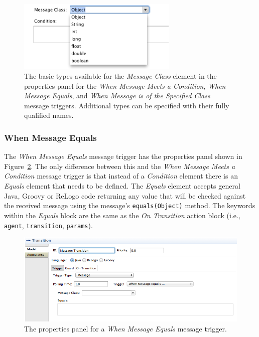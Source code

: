 \documentclass[11pt]{amsart}
\begin{document}
\begin{figure}
\begin{center}
\vspace{.2in}
\centerline {
\includegraphics[width=3.0in]{StatechartsImages/MessageClassType.png}
}
\caption{The basic types available for the \emph{Message Class} element in the properties panel for the \emph{When Message Meets a Condition}, \emph{When Message Equals}, and \emph{When Message is of the Specified Class} message triggers. Additional types can be specified with their fully qualified names.}
\label{fig:messageClassType}
\end{center}
\end{figure}
\clearpage


\subsubsection{When Message Equals}
The \emph{When Message Equals} message trigger has the properties panel shown in Figure~\ref{fig:message2TransitionProperties}. The only difference between this and the \emph{When Message Meets a Condition} message trigger is that instead of a \emph{Condition} element there is an \emph{Equals} element that needs to be defined. The \emph{Equals} element accepts general Java, Groovy or ReLogo code returning any value that will be checked against the received message using the message's \texttt{equals(Object)} method. The keywords within the \emph{Equals} block are the same as the \emph{On Transition} action block (i.e., \texttt{agent}, \texttt{transition}, \texttt{params}).

\begin{figure}
\begin{center}
\vspace{.2in}
\centerline {
\includegraphics[width=5in]{StatechartsImages/Message2TransitionProperties.png}
}
\caption{The properties panel for a \emph{When Message Equals} message trigger.}
\label{fig:message2TransitionProperties}
\end{center}
\end{figure}
\clearpage
\end{document}

